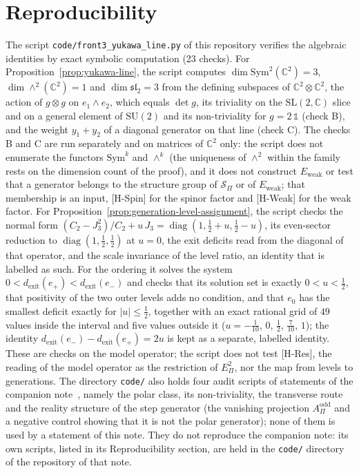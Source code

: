 \documentclass[11pt]{article}
\theoremstyle{definition}
\theoremstyle{remark}
\newcommand{\AOdd}{A_{\Pi}^{\mathrm{odd}}}
\newcommand{\Jthree}{J_{3}}
\newcommand{\Epi}{E_{\Pi}}
\newcommand{\Sbundle}{\mathcal{S}_{\Pi}}
\newcommand{\Ew}{E_{\mathrm{weak}}}
\newcommand{\Sym}{\mathrm{Sym}}
\newcommand{\SU}{\mathrm{SU}}
\newcommand{\SL}{\mathrm{SL}}
\newcommand{\diag}{\operatorname{diag}}
\begin{document}
  \section{Reproducibility}
    \label{sec:repro}

    The script \texttt{code/front3\_yukawa\_line.py} of this repository verifies the algebraic identities by exact
    symbolic computation (23 checks).
    For Proposition~\ref{prop:yukawa-line}, the script computes $\dim \Sym^{2}(\mathbb{C}^{2}) = 3$,
    $\dim \wedge^{2}(\mathbb{C}^{2}) = 1$ and $\dim \mathfrak{sl}_{2} = 3$ from the defining subspaces of
    $\mathbb{C}^{2} \otimes \mathbb{C}^{2}$, the action of $g \otimes g$ on $e_{1} \wedge e_{2}$, which equals $\det g$,
    its triviality on the $\SL(2,\mathbb{C})$ slice and on a general element of $\SU(2)$ and its non-triviality
    for $g = 2\,\mathbb{1}$ (check B), and the weight $y_{1} + y_{2}$ of a diagonal generator on that line (check C).
    The checks B and C are run separately and on matrices of $\mathbb{C}^{2}$ only: the script does not enumerate the
    functors $\Sym^{k}$ and $\wedge^{k}$ (the uniqueness of $\wedge^{2}$ within the family rests on the dimension count
    of the proof), and it does not construct $\Ew$ or test that a generator belongs to the structure group of
    $\Sbundle$ or of $\Ew$; that membership is an input, [H-Spin] for the spinor factor and [H-Weak] for the weak
    factor.
    For Proposition~\ref{prop:generation-level-assignment}, the script checks the normal form
    $(C_{2} - \Jthree^{2})/C_{2} + u\,\Jthree = \diag(1, \tfrac12 + u, \tfrac12 - u)$, its even-sector reduction to
    $\diag(1, \tfrac12, \tfrac12)$ at $u = 0$, the exit deficits read from the diagonal of that operator, and the
    scale invariance of the level ratio, an identity that is labelled as such.
    For the ordering it solves the system $0 < d_{\mathrm{exit}}(e_{+}) < d_{\mathrm{exit}}(e_{-})$ and checks that
    its solution set is exactly $0 < u < \tfrac12$, that positivity of the two outer levels adds no condition, and
    that $e_{0}$ has the smallest deficit exactly for $|u| \leq \tfrac12$, together with an exact rational
    grid of $49$ values inside the interval and five values outside it
    ($u = -\tfrac1{10}$, $0$, $\tfrac12$, $\tfrac7{10}$, $1$);
    the identity $d_{\mathrm{exit}}(e_{-}) - d_{\mathrm{exit}}(e_{+}) = 2u$ is kept as a separate, labelled identity.
    These are checks on the model operator; the script does not test [H-Res], the reading of the model operator as the
    restriction of $\Epi^{2}$, nor the map from levels to generations.
    The directory \texttt{code/} also holds four audit scripts of statements of the companion
    note~\cite{Beau2026pyo}, namely the polar class, its non-triviality, the transverse route and the reality
    structure of the step generator (the vanishing projection $\AOdd$ and a negative control showing that it is not
    the polar generator); none of them is used by a statement of this note.
    They do not reproduce the companion note: its own scripts, listed in its Reproducibility section, are held in the
    \texttt{code/} directory of the repository of that note.

  \newpage

  
  
\end{document}
